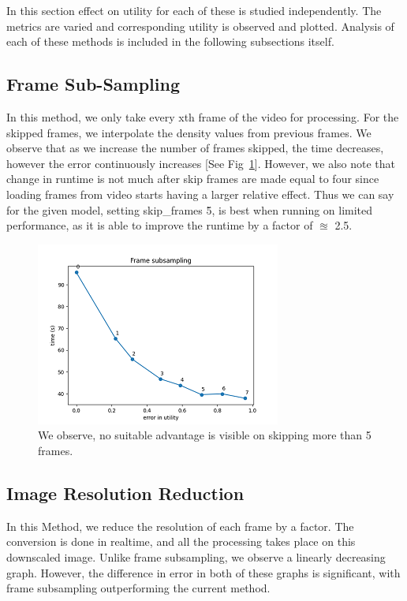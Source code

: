\documentclass[conference]{IEEEtran}
\begin{document}
In this section effect on utility for each of these is studied independently. The metrics are varied and corresponding 
utility is observed and plotted. Analysis of each of these methods is included in the following subsections itself.

\subsection{Frame Sub-Sampling}

In this method, we only take every xth frame of the video for processing. For the skipped frames, we interpolate the density values from previous frames. We observe that as we increase the number of frames skipped, the time decreases, however the error continuously increases [See Fig~\ref{skf_evt}].
However, we also note that change in runtime is not much after skip frames are made equal to four since loading frames from video starts having a larger relative effect.
Thus we can say for the given model, setting skip\_frames \= 5, is best 
when running on limited performance, as it is able to improve the runtime by a factor of $\approxeq$ 2.5.

\begin{figure}[htbp]
\centerline{\includegraphics{plots/plot_skip_frames.png}}
\caption{We observe, no suitable advantage is visible on skipping more than 5 frames.}
\label{skf_evt} 
\end{figure}


\subsection{Image Resolution Reduction}

In this Method, we reduce the resolution of each frame by a factor. The conversion is done in realtime, and all the processing takes place on this downscaled image.
Unlike frame subsampling, we observe a linearly decreasing graph. However, the difference in error in both of these graphs is significant, with frame subsampling outperforming the current method.
\end{document}
